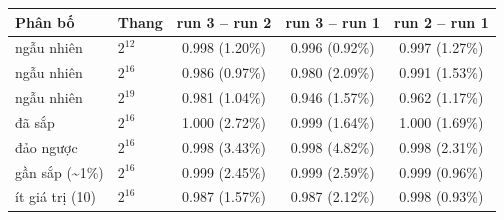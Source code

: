 \begin{tabular}{llccc}
\toprule
Phân bố & Thang & run 3 -- run 2 & run 3 -- run 1 & run 2 -- run 1 \\
\midrule
ngẫu nhiên & $2^{12}$ & 0.998 (1.20\%) & 0.996 (0.92\%) & 0.997 (1.27\%) \\
ngẫu nhiên & $2^{16}$ & 0.986 (0.97\%) & 0.980 (2.09\%) & 0.991 (1.53\%) \\
ngẫu nhiên & $2^{19}$ & 0.981 (1.04\%) & 0.946 (1.57\%) & 0.962 (1.17\%) \\
đã sắp & $2^{16}$ & 1.000 (2.72\%) & 0.999 (1.64\%) & 1.000 (1.69\%) \\
đảo ngược & $2^{16}$ & 0.998 (3.43\%) & 0.998 (4.82\%) & 0.998 (2.31\%) \\
gần sắp (\textasciitilde 1\%) & $2^{16}$ & 0.999 (2.45\%) & 0.999 (2.59\%) & 0.999 (0.96\%) \\
ít giá trị (10) & $2^{16}$ & 0.987 (1.57\%) & 0.987 (2.12\%) & 0.998 (0.93\%) \\
\bottomrule
\end{tabular}
